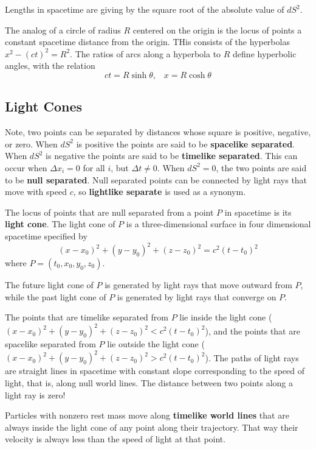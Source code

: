 Lengths in spacetime are giving by the square root of the absolute value of $dS^2$.

\begin{eg}
    The analog of a circle of radius $R$ centered on the origin is the locus of points a constant spacetime distance from the origin. THis consists of the hyperbolas $x^2-(ct)^2 = R^2$. The ratios of arcs along a hyperbola to $R$ define hyperbolic angles, with the relation $$ct = R\sinh\theta,\;\;\;x = R\cosh\theta$$
\end{eg}


\subsection{Light Cones}

Note, two points can be separated by distances whose square is positive, negative, or zero. When $dS^2$ is positive the points are said to be \textbf{spacelike separated}. When $dS^2$ is negative the points are said to be \textbf{timelike separated}. This can occur when $\Delta x_i = 0$ for all $i$, but $\Delta t \neq 0$. When $dS^2 = 0$, the two points are said to be \textbf{null separated}. Null separated points can be connected by light rays that move with speed $c$, so \textbf{lightlike separate} is used as a synonym.

\begin{defn}
    The locus of points that are null separated from a point $P$ in spacetime is its \textbf{light cone}. The light cone of $P$ is a three-dimensional surface in four dimensional spacetime specified by $$(x-x_0)^2+(y-y_0)^2+(z-z_0)^2 = c^2(t-t_0)^2$$
    where $P = (t_0,x_0,y_0,z_0)$. 
\end{defn}

The future light cone of $P$ is generated by light rays that move outward from $P$, while the past light cone of $P$ is generated by light rays that converge on $P$.

The points that are timelike separated from $P$ lie inside the light cone ($(x-x_0)^2+(y-y_0)^2+(z-z_0)^2 < c^2(t-t_0)^2$), and the points that are spacelike separated from $P$ lie outside the light cone ($(x-x_0)^2+(y-y_0)^2+(z-z_0)^2 > c^2(t-t_0)^2$). The paths of light rays are straight lines in spacetime with constant slope corresponding to the speed of light, that is, along null world lines. The distance between two points along a light ray is zero!


Particles with nonzero rest mass move along \textbf{timelike world lines} that are always inside the light cone of any point along their trajectory. That way their velocity is always less than the speed of light at that point.

